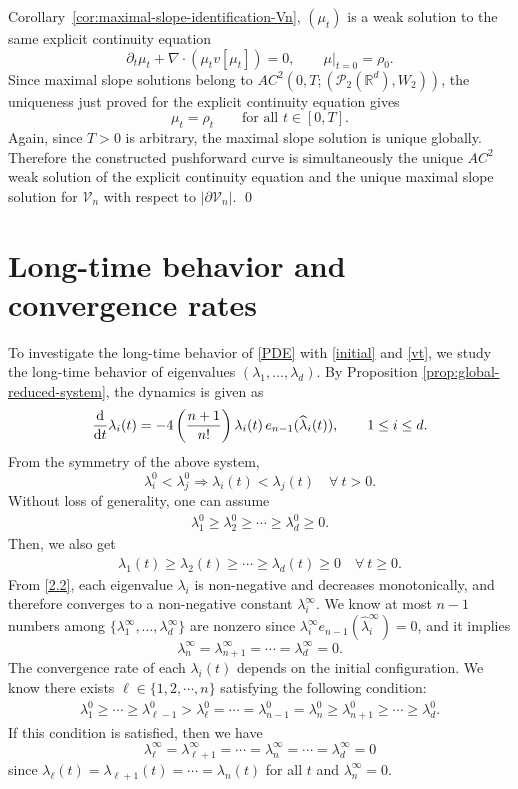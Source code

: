 \documentclass[11pt,reqno]{amsart}
\numberwithin{figure}{section}
\def\d {{\partial}}
\def\d{\mathrm{d}}
\newcommand{\dm}{d}
\renewcommand{\d}{  {\textup{d}} }
\begin{document}
Corollary~\ref{cor:maximal-slope-identification-Vn}, $(\mu_t)$ is a weak solution to the same explicit continuity equation \[ \partial_t\mu_t+\nabla\cdot(\mu_t v[\mu_t])=0, \qquad \mu|_{t=0}=\rho_0. \] Since maximal slope solutions belong to $AC^2(0,T;(\mathcal P_2(\mathbb R^d),W_2))$, the uniqueness just proved for the explicit continuity equation gives \[ \mu_t=\rho_t \qquad \text{for all }t\in[0,T]. \] Again, since $T>0$ is arbitrary, the maximal slope solution is unique globally. Therefore the constructed pushforward curve is simultaneously the unique $AC^2$ weak solution of the explicit continuity equation and the unique maximal slope solution for $\mathcal V_n$ with respect to $|\partial\mathcal V_n|$.
\qed



\section{Long-time behavior and convergence rates} \label{sec:4}
\setcounter{equation}{0}
 

To investigate the long-time behavior of \eqref{PDE} with \eqref{initial} and \eqref{vt}, we study the long-time behavior of eigenvalues $(\lambda_1,\dots,\lambda_d)$. By Proposition \ref{prop:global-reduced-system}, the dynamics is given as
\[
\frac{\d}{\d t}\lambda_i(t) = -4\left(\frac{n+1}{n!}\right)\lambda_i(t)\,e_{n-1}(\widehat\lambda_i(t)), \qquad 1\le i\le d.
\]
From the symmetry of the above system, 
\[
\lambda_i^0<\lambda_j^0\Longrightarrow \lambda_i(t)<\lambda_j(t)\quad \forall~t>0.
\]
Without loss of generality, one can assume
\begin{align*}
\lambda_1^0\geq\lambda_2^0\geq\cdots\geq\lambda_{\dm}^0\geq0.
\end{align*}
Then, we also get
\begin{align}\label{monotoncondi}
\lambda_1(t)\geq\lambda_2(t)\geq\cdots\geq\lambda_{\dm}(t)\geq0\quad\forall~t\geq0.
\end{align}
From \eqref{2.2}, each eigenvalue $\lambda_i$ is non-negative and decreases monotonically, and therefore converges to a non-negative constant $\lambda_i^\infty$. We know at most $n-1$ numbers among $\{\lambda_1^\infty,\ldots,\lambda_d^\infty\}$ are nonzero since $\lambda_i^\infty e_{n-1}(\hat{\lambda}_i^\infty)=0$, and it implies
\[
\lambda_n^\infty=\lambda_{n+1}^\infty=\cdots=\lambda_\dm^\infty=0.
\]
The convergence rate of each $\lambda_i(t)$ depends on the initial configuration. We know there exists $\ell\in \{1, 2, \cdots, n\}$ satisfying the following condition:
\begin{align}\label{initial-condi-l}
\lambda_1^0\geq \cdots\geq \lambda_{\ell-1}^0>\lambda_{\ell}^0=\cdots=\lambda_{n-1}^0=\lambda_n^0\geq \lambda_{n+1}^0\geq\cdots \geq \lambda_d^0.
\end{align}
If this condition is satisfied, then we have
\[
\lambda_{\ell}^\infty=\lambda_{\ell+1}^\infty=\cdots=\lambda_n^\infty=\cdots=\lambda_\dm^\infty=0
\]
since $\lambda_{\ell}(t)=\lambda_{\ell+1}(t)=\cdots=\lambda_n(t)$ for all $t$ and $\lambda_n^\infty=0$.
\end{document}

